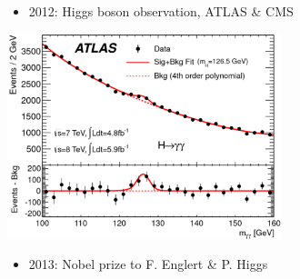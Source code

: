 \documentclass[11pt,xcolor=dvipsnames,aspectratio=169]{beamer}
\begin{document}
\begin{frame}
{\begin{minipage}[t]{0.70\linewidth}
\begin{itemize}
        W, Z masses. 
      \item 2012: Higgs boson observation, ATLAS \& CMS
      \end{itemize}
      \hspace{0.1\textwidth}
      \includegraphics[width=0.6\textwidth]{figures/l1/intro/ATLAS_Higgs.png}
      \begin{itemize} 
      \item 2013: Nobel prize to F. Englert \& P. Higgs
      \end{itemize}      
    \end{minipage}}
\end{frame}
\end{document}
